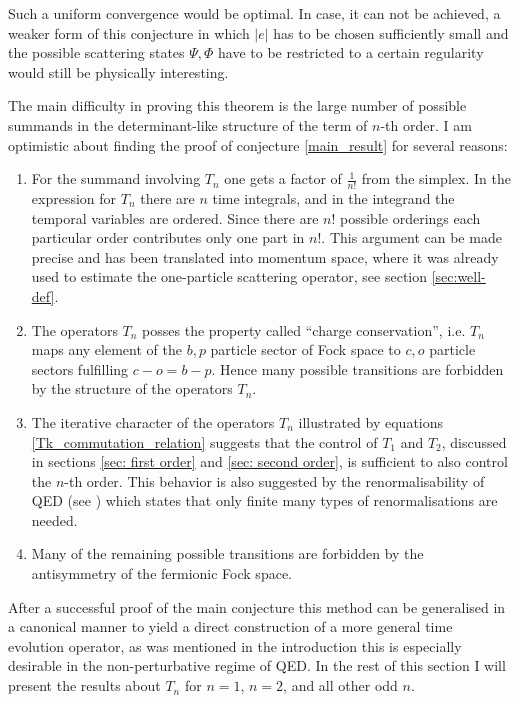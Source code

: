 \documentclass[b5paper,draft,openbib,12pt]{memoir}
\begin{document}
Such a uniform convergence would be optimal. In case, it can not be achieved, a
weaker form of this conjecture in which $|e|$ has to be chosen sufficiently
small and the possible scattering states $\Psi,\Phi$ have to be restricted to a
certain regularity would still be physically interesting.

The main difficulty in proving this theorem is the large number of  possible
summands in the determinant-like structure of the term of \(n\)-th order.  I am
optimistic about finding the proof of conjecture \ref{main_result} for several
reasons:

\begin{enumerate}
\item For the summand involving \(T_n\) one gets a factor of \(\frac{1}{n!}\)
    from the simplex. In the expression for \(T_n\) there are \(n\) time
    integrals, and in the integrand the temporal variables are ordered. Since
    there are \(n!\) possible orderings each particular order contributes only
    one part in \(n!\). This argument can be made precise and has been
    translated into momentum space, where it was already used to estimate the
    one-particle scattering operator, see section \ref{sec:well-def}.
\item The operators \(T_n\) posses the property called ``charge conservation'',
    i.e. \(T_n\) maps any element of the \(b,p\) particle sector of Fock space
    to \(c,o\) particle sectors fulfilling \(c-o=b-p\). Hence many possible
    transitions are forbidden by the structure of the operators \(T_n\).
\item The iterative character of the operators \(T_n\) illustrated by equations \eqref{Tk_commutation_relation}
    suggests that the control of $T_1$ and $T_2$, discussed in sections \ref{sec: first order} and 
    \ref{sec: second order}, is sufficient to also control the $n$-th
    order. This behavior is also suggested by the renormalisability of QED (see \cite[Chapter
    4.3]{scharf2014finite}) which states that only finite many types of renormalisations
    are needed.
\item Many of the remaining possible transitions are forbidden by the
    antisymmetry of the fermionic Fock space.
\end{enumerate}

After a successful proof of the main conjecture this method can be generalised in a canonical manner to yield a direct construction of a more general time evolution operator, as was mentioned in the introduction this is especially desirable in the non-perturbative regime of QED.
In the rest of this section I will present the results about $T_n$ for $n=1$,
$n=2$, and all other odd $n$.
\end{document}
